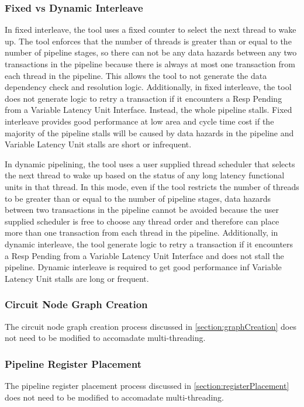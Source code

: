\subsubsection{Fixed vs Dynamic Interleave}
In fixed interleave, the tool uses a fixed counter to select the next thread to wake up. The tool enforces that the number of threads is greater than or equal to the number of pipeline stages, so there can not be any data hazards between any two transactions in the pipeline because there is always at most one transaction from each thread in the pipeline. This allows the tool to not generate the data dependency check and resolution logic. Additionally, in fixed interleave, the tool does not generate logic to retry a transaction if it encounters a Resp Pending from a Variable Latency Unit Interface. Instead, the whole pipeline stalls. Fixed interleave provides good performance at low area and cycle time cost if the majority of the pipeline stalls will be caused by data hazards in the pipeline and Variable Latency Unit stalls are short or infrequent.

In dynamic pipelining, the tool uses a user supplied thread scheduler that selects the next thread to wake up based on the status of any long latency functional units in that thread. In this mode, even if the tool restricts the number of threads to be greater than or equal to the number of pipeline stages, data hazards between two transactions in the pipeline cannot be avoided because the user supplied scheduler is free to choose any thread order and therefore can place more than one transaction from each thread in the pipeline. Additionally, in dynamic interleave, the tool generate logic to retry a transaction if it encounters a Resp Pending from a Variable Latency Unit Interface and does not stall the pipeline. Dynamic interleave is required to get good performance inf Variable Latency Unit stalls are long or frequent.

\subsubsection{Circuit Node Graph Creation}
The circuit node graph creation process discussed in \ref{section:graphCreation} does not need to be modified to accomadate multi-threading.

\subsubsection{Pipeline Register Placement}
The pipeline register placement process discussed in \ref{section:registerPlacement} does not need to be modified to accomadate multi-threading.


